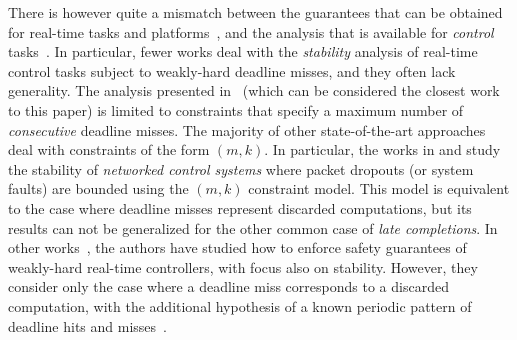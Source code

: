 There is however quite a mismatch between the guarantees that can be obtained for real-time tasks and platforms~\cite{Hammadeh:2017b, Hammadeh:2019, choi2019job, pazzaglia2020generalized}, and the analysis that is available for \emph{control} tasks~\cite{Pazzaglia:2018, Maggio:2020}.
In particular, fewer works deal with the \emph{stability} analysis of real-time control tasks subject to weakly-hard deadline misses, and they often lack generality. 
The analysis presented in~\cite{Maggio:2020} (which can be considered the closest work to this paper) is limited to constraints that specify a maximum number of \emph{consecutive} deadline misses.
The majority of other state-of-the-art approaches deal with constraints of the form $(m,k)$.\fix{}
In particular, the works in \cite{Linsenmayer:2017} and \cite{linsenmayer2020linear} study the stability of \emph{networked control systems} where packet dropouts (or system faults) are bounded using the $(m,k)$ constraint model.\fix{}
This model is equivalent to the case where deadline misses represent discarded computations, but its results can not be generalized for the other common case of \emph{late completions}.
In other works~\cite{huang2019exploring,liang2019security,liang2020leveraging}, the authors have studied how to enforce safety guarantees of weakly-hard real-time controllers, with focus also on stability. However, they consider only the case where a deadline miss corresponds to a discarded computation, with the additional hypothesis of a known periodic pattern of deadline hits and misses~\cite{liang2019security,liang2020leveraging}.

